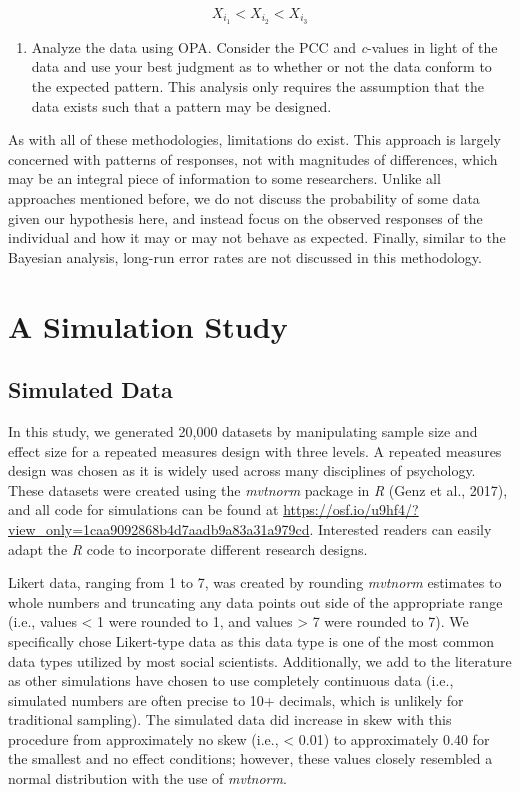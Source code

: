 \documentclass[,man, mask]{apa6}
\providecommand{\tightlist}{%
  \setlength{\itemsep}{0pt}\setlength{\parskip}{0pt}}
\theoremstyle{definition}
\theoremstyle{definition}
\theoremstyle{definition}
\theoremstyle{remark}
\begin{document}
\[
  X_{i_1} < X_{i_2} < X_{i_3}   
\]

\begin{enumerate}
\def\labelenumi{\arabic{enumi})}
\setcounter{enumi}{1}
\tightlist
\item
  Analyze the data using OPA. Consider the PCC and \emph{c}-values in
  light of the data and use your best judgment as to whether or not the
  data conform to the expected pattern. This analysis only requires the
  assumption that the data exists such that a pattern may be designed.
\end{enumerate}

As with all of these methodologies, limitations do exist. This approach
is largely concerned with patterns of responses, not with magnitudes of
differences, which may be an integral piece of information to some
researchers. Unlike all approaches mentioned before, we do not discuss
the probability of some data given our hypothesis here, and instead
focus on the observed responses of the individual and how it may or may
not behave as expected. Finally, similar to the Bayesian analysis,
long-run error rates are not discussed in this methodology.

\section{A Simulation Study}\label{a-simulation-study}

\subsection{Simulated Data}\label{simulated-data}

In this study, we generated 20,000 datasets by manipulating sample size
and effect size for a repeated measures design with three levels. A
repeated measures design was chosen as it is widely used across many
disciplines of psychology. These datasets were created using the
\emph{mvtnorm} package in \emph{R} (Genz et al., 2017), and all code for
simulations can be found at
\url{https://osf.io/u9hf4/?view_only=1caa9092868b4d7aadb9a83a31a979cd}.
Interested readers can easily adapt the \emph{R} code to incorporate
different research designs.

Likert data, ranging from 1 to 7, was created by rounding \emph{mvtnorm}
estimates to whole numbers and truncating any data points out side of
the appropriate range (i.e., values \textless{} 1 were rounded to 1, and
values \textgreater{} 7 were rounded to 7). We specifically chose
Likert-type data as this data type is one of the most common data types
utilized by most social scientists. Additionally, we add to the
literature as other simulations have chosen to use completely continuous
data (i.e., simulated numbers are often precise to 10+ decimals, which
is unlikely for traditional sampling). The simulated data did increase
in skew with this procedure from approximately no skew (i.e.,
\textless{} 0.01) to approximately 0.40 for the smallest and no effect
conditions; however, these values closely resembled a normal
distribution with the use of \emph{mvtnorm}.
\end{document}
